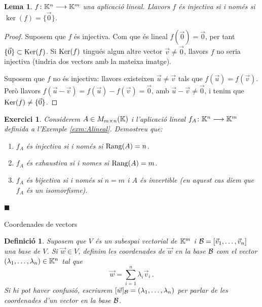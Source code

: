 \documentclass[
  11pt,
]{book}
\makeatletter
\numberwithin{dummy}{section}
\theoremstyle{maincolornumbox}
\newtheorem{exerciseT}{Exercici}[chapter]
\theoremstyle{blacknumex}
\theoremstyle{blacknumbox}
\newtheorem{definitionT}{Definició}[chapter]
\theoremstyle{maincolornum}
\newtheorem{lemmaT}{Lema}[chapter]
\newenvironment{lemma}{\begin{pBox}\begin{lemmaT}}{\end{lemmaT}\end{pBox}}
\newenvironment{exercise}{\begin{eBox}\begin{exerciseT}}{\hfill{\color{maincolor}\tiny\ensuremath{\blacksquare}}\end{exerciseT}\end{eBox}}
\newenvironment{definition}{\begin{dBox}\begin{definitionT}}{\end{definitionT}\end{dBox}}
\renewcommand{\section}{\@startsection{section}{1}{\z@}
{-4ex \@plus -1ex \@minus -.4ex}
{1ex \@plus.2ex }
{\normalfont\large\sffamily\bfseries}}
\newlength\esp
\makeatother
\begin{document}
\begin{lemma}
\(f \colon \mathbb{K}^n \longrightarrow \mathbb{K}^m\) una aplicació lineal. Llavors \(f\) és injectiva
si i només si \(\ker(f)=\{\vec 0\}\).
\end{lemma}

\begin{proof}
Suposem que \(f\) és injectiva. Com que és lineal
\(f(\vec 0)=\vec 0\), per tant \(\{\vec 0\} \subset \operatorname{Ker}(f)\). Si \(\operatorname{Ker}(f)\)
tingués algun altre vector \(\vec v \neq \vec 0\), llavors \(f\) no seria
injectiva (tindria dos vectors amb la mateixa imatge).

Suposem que \(f\) no és injectiva: llavors existeixen \(\vec u \neq \vec v\)
tals que \(f(\vec u)=f(\vec v)\). Però llavors
\(f(\vec u- \vec v)=f(\vec u)-f(\vec v)=\vec 0\), amb
\(\vec u-\vec v\neq \vec 0\), i tenim que \(\operatorname{Ker}(f)\neq \{\vec 0\}\).
\end{proof}

\begin{exercise}

Considerem \(A \in M_{m\times n}(\mathbb{K})\) i l'aplicació lineal
\(f_A\colon \mathbb{K}^n\longrightarrow \mathbb{K}^m\) definida a l'Exemple
\ref{exm:Alineal}. Demostreu que:

\begin{enumerate}
\def\labelenumi{(\alph{enumi})}
\item
  \(f_A\) és injectiva si i només si \(\operatorname{Rang}(A)=n\).
\item
  \(f_A\) és exhaustiva si i nomes si \(\operatorname{Rang}(A)=m\).
\item
  \(f_A\) és bijectiva si i només si \(n=m\) i \(A\) és invertible (en
  aquest cas diem que \(f_A\) és un isomorfisme).
\end{enumerate}

\end{exercise}

\section{Coordenades de vectors}\label{coordenades-de-vectors}

\begin{definition}
Suposem que \(V\) és un subespai vectorial de \(\mathbb{K}^m\) i
\(\mathcal{B} =[\vec v_1, \dots, \vec v_n]\) una base de \(V\). Si \(\vec w \in V\),
definim les \emph{coordenades de \(\vec w\) en la base \(\mathcal{B}\)} com el vector
\((\lambda_1,\dots,\lambda_n)\in\mathbb{K}^n\) tal que
\[\vec w = \sum_{i=1}^n \lambda_i \vec v_i \,.\] Si hi pot haver
confusió, escriurem \([\vec w]_{\mathcal{B}}=(\lambda_1,\dots,\lambda_n)\) per
parlar de les coordenades d'un vector en la base \(\mathcal{B}\).
\end{definition}
\end{document}
